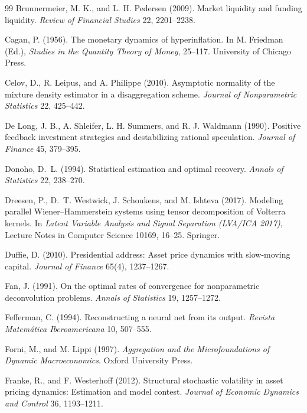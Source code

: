 \documentclass[12pt]{article}
\theoremstyle{definition}
\theoremstyle{remark}
\begin{document}
\begin{thebibliography}{99}
 Brunnermeier, M. K., and L. H. Pedersen (2009). Market liquidity and funding liquidity. \emph{Review of Financial Studies} 22, 2201--2238.

 Cagan, P. (1956). The monetary dynamics of hyperinflation. In M. Friedman (Ed.), \emph{Studies in the Quantity Theory of Money}, 25--117. University of Chicago Press.

 Celov, D., R. Leipus, and A. Philippe (2010). Asymptotic normality of the mixture density estimator in a disaggregation scheme. \emph{Journal of Nonparametric Statistics} 22, 425--442.

 De Long, J. B., A. Shleifer, L. H. Summers, and R. J. Waldmann (1990). Positive feedback investment strategies and destabilizing rational speculation. \emph{Journal of Finance} 45, 379--395.

 Donoho, D.~L. (1994). Statistical estimation and optimal recovery. \emph{Annals of Statistics} 22, 238--270.

 Dreesen, P., D.~T. Westwick, J. Schoukens, and M. Ishteva (2017). Modeling parallel Wiener--Hammerstein systems using tensor decomposition of Volterra kernels. In \emph{Latent Variable Analysis and Signal Separation (LVA/ICA 2017)}, Lecture Notes in Computer Science 10169, 16--25. Springer.

 Duffie, D. (2010). Presidential address: Asset price dynamics with slow-moving capital. \emph{Journal of Finance} 65(4), 1237--1267.

 Fan, J. (1991). On the optimal rates of convergence for nonparametric deconvolution problems. \emph{Annals of Statistics} 19, 1257--1272.

 Fefferman, C. (1994). Reconstructing a neural net from its output. \emph{Revista Matem\'atica Iberoamericana} 10, 507--555.

 Forni, M., and M. Lippi (1997). \emph{Aggregation and the Microfoundations of Dynamic Macroeconomics}. Oxford University Press.

 Franke, R., and F. Westerhoff (2012). Structural stochastic volatility in asset pricing dynamics: Estimation and model contest. \emph{Journal of Economic Dynamics and Control} 36, 1193--1211.


\end{thebibliography}
\end{document}
